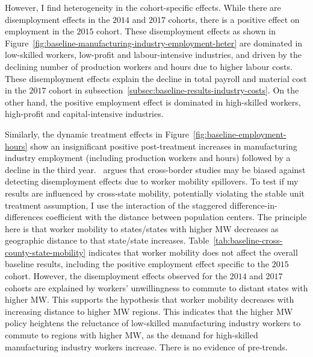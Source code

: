\documentclass[numsec,webpdf,contemporary,large,namedate]{oup-authoring-template}%
\begin{document}
    However, I find heterogeneity in the cohort-specific effects. While there are disemployment effects in the $2014$ and $2017$ cohorts, there is a positive effect on employment in the $2015$ cohort. These disemployment effects as shown in Figure~\ref{fig:baseline-manufacturing-industry-employment-heter} are dominated in low-skilled workers, low-profit and labour-intensive industries, and driven by the declining number of production workers and hours due to higher labour costs. These disemployment effects explain the decline in total payroll and material cost in the $2017$ cohort in subsection~\ref{subsec:baseline-results-industry-costs}. On the other hand, the positive employment effect is dominated in high-skilled workers, high-profit and capital-intensive industries.

    Similarly, the dynamic treatment effects in Figure~\ref{fig:baseline-employment-hours} show an insignificant positive post-treatment increases in manufacturing industry employment (including production workers and hours) followed by a decline in the third year.~\citet{neumark2019econometrics} argues that cross-border studies may be biased against detecting disemployment effects due to worker mobility spillovers. To test if my results are influenced by cross-state mobility, potentially violating the stable unit treatment assumption, I use the interaction of the staggered difference-in-differences coefficient with the distance between population centers. The principle here is that worker mobility to states/states with higher MW decreases as geographic distance to that state/state increases. Table~\ref{tab:baseline-cross-county-state-mobility} indicates that worker mobility does not affect the overall baseline results, including the positive employment effect specific to the $2015$ cohort. However, the disemployment effects observed for the $2014$ and $2017$ cohorts are explained by workers' unwillingness to commute to distant states with higher MW. This supports the hypothesis that worker mobility decreases with increasing distance to higher MW regions. This indicates that the higher MW policy heightens the reluctance of low-skilled manufacturing industry workers to commute to regions with higher MW, as the demand for high-skilled manufacturing industry workers increase. There is no evidence of pre-trends.
    
    
\end{document}
